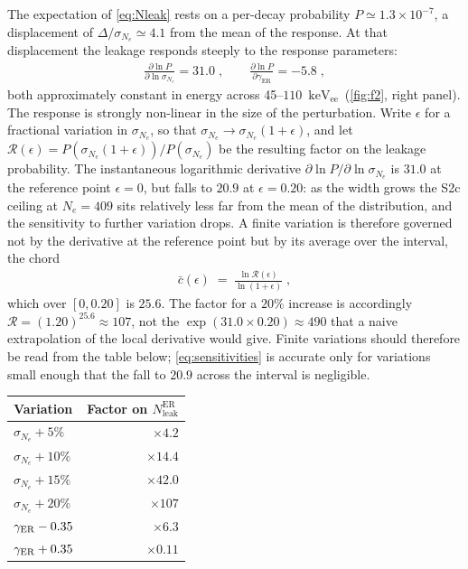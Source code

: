 \documentclass[11pt,a4paper]{article}
\newcommand{\keVee}{\ensuremath{\mathrm{keV_{ee}}}}
\begin{document}
The expectation of \cref{eq:Nleak} rests on a per-decay probability
\(P\simeq1.3\times10^{-7}\), a displacement of
\(\Delta/\sigma_{N_e}\simeq4.1\) from the mean of the response. At that
displacement the leakage responds steeply to the response parameters:
\begin{align}
    \label{eq:sensitivities}
    \frac{\partial\ln P}{\partial\ln\sigma_{N_e}}=31.0\;,\qquad
    \frac{\partial\ln P}{\partial\gamma_\mathrm{ER}}=-5.8\;,
\end{align}
both approximately constant in energy across
45--\(110\)~\keVee\ (\cref{fig:f2}, right panel).
The response is strongly non-linear in the size of the perturbation.
Write \(\epsilon\) for a fractional variation in \(\sigma_{N_e}\), so
that \(\sigma_{N_e}\to\sigma_{N_e}(1+\epsilon)\), and let
\(\mathcal{R}(\epsilon)=P(\sigma_{N_e}(1+\epsilon))/P(\sigma_{N_e})\)
be the resulting factor on the leakage probability. The instantaneous
logarithmic derivative \(\partial\ln P/\partial\ln\sigma_{N_e}\) is
\(31.0\) at the reference point \(\epsilon=0\), but falls to \(20.9\)
at \(\epsilon=0.20\): as the width grows the S2c ceiling at
\(N_e=409\) sits relatively less far from the mean of the
distribution, and the sensitivity to further variation drops. A finite
variation is therefore governed not by the derivative at the reference
point but by its average over the interval, the chord
\begin{align}
    \bar{c}(\epsilon)\;=\;\frac{\ln \mathcal{R}(\epsilon)}{\ln(1+\epsilon)}\;,
\end{align}
which over \([0,0.20]\) is \(25.6\). The factor for a \(20\%\)
increase is accordingly \(\mathcal{R}=(1.20)^{25.6}\approx107\), not
the \(\exp(31.0\times0.20)\approx490\) that a naive extrapolation of
the local derivative would give. Finite variations should therefore be
read from the table below; \cref{eq:sensitivities} is accurate only
for variations small enough that the fall to \(20.9\) across the
interval is negligible.


\begin{center}
\begin{tabular}{lr}
\toprule
Variation & Factor on \(N^\mathrm{ER}_\mathrm{leak}\)\\
\midrule
\(\sigma_{N_e}+5\%\) & \(\times4.2\)\\
\(\sigma_{N_e}+10\%\) & \(\times14.4\)\\
\(\sigma_{N_e}+15\%\) & \(\times42.0\)\\
\(\sigma_{N_e}+20\%\) & \(\times107\)\\
\(\gamma_{\rm ER}-0.35\) & \(\times6.3\)\\
\(\gamma_{\rm ER}+0.35\) & \(\times0.11\)\\
\bottomrule
\end{tabular}
\end{center}
\end{document}
